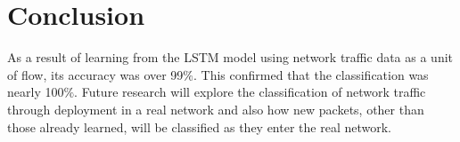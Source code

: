 \documentclass[10pt, twoside, jounal]{IEEEtran}
\begin{document}
%


\section{Conclusion}
As a result of learning from the LSTM model using network traffic data as a unit of flow, its accuracy was over 99$\%$. This confirmed that the classification was nearly 100$\%$.
Future research will explore the classification of network traffic through deployment in a real network and also how new packets, other than those already learned, will be classified as they enter the real network.

\ifCLASSOPTIONcaptionsoff
  \newpage
\fi


\end{document}
